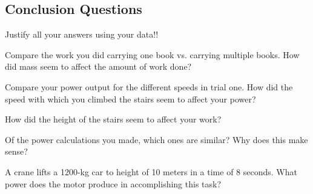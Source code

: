 \documentclass[10pt]{exam}
\begin{document}
\begin{questions}
\begin{EnvUplevel}
  \section*{Conclusion Questions}
  
  Justify all your answers using your data!!

\end{EnvUplevel}

\question
  Compare the work you did carrying one book vs. carrying multiple books.  How did mass seem to affect the amount of work done?
  \vs


\question
  Compare your power output for the different speeds in trial one.  How did the speed with which you climbed the stairs seem to affect your power?
  \vs

\question
  How did the height of the stairs seem to affect your work?
  \vs

\question
  Of the power calculations you made, which ones are similar?  Why does this make sense?
  \vs





\question
  A crane lifts a 1200-kg car to height of 10 meters in a time of 8 seconds.  What power does the motor produce in accomplishing this task?
  \vs[2]

  

\end{questions}
\end{document}
